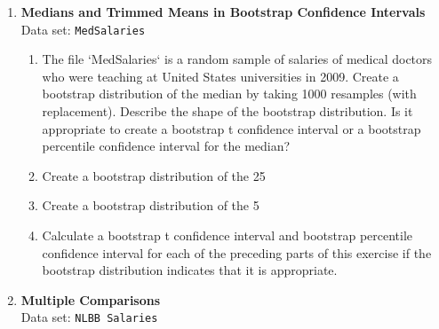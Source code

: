 \documentclass[
]{report}
\begin{document}
\begin{enumerate}
\begin{enumerate}
Take a simple random sample of size n = 40 from the ChiSq data. Create a bootstrap distribution of the 25%
  \end{enumerate}
  
  
  \item \textbf{Medians and Trimmed Means in Bootstrap Confidence Intervals} \\
  Data set: \texttt{MedSalaries} 
  \begin{enumerate}
      
  \item The file `MedSalaries` is a random sample of salaries of medical doctors who were teaching at United States universities in 2009. Create a bootstrap distribution of the median by taking 1000 resamples (with replacement). Describe the shape of the bootstrap distribution. Is it appropriate to create a bootstrap t confidence interval or a bootstrap percentile confidence interval for the median?
    \item Create a bootstrap distribution of the 25%
    \item Create a bootstrap distribution of the 5%
    \item Calculate a bootstrap t confidence interval and bootstrap percentile confidence interval for each of the preceding parts of this exercise if the bootstrap distribution indicates that it is appropriate.
  \end{enumerate}
  

  \item \textbf{Multiple Comparisons} \\
  Data set: \texttt{NLBB Salaries}
  \begin{enumerate}
      

\end{enumerate}
\end{enumerate}
\end{document}

